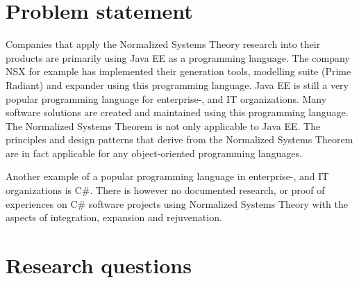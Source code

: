 \section{Problem statement} \label{problem_statement}
Companies that apply the Normalized Systems Theory research into their products are
primarily using Java EE as a programming language. The company NSX for example has
implemented their generation tools, modelling suite (Prime Radiant) and expander using
this programming language. Java EE is still a very popular programming language for
enterprise-, and IT organizations. Many software solutions are created and maintained
using this programming language. The Normalized Systems Theorem is not only applicable to
Java EE. The principles and design patterns that derive from the Normalized Systems
Theorem are in fact applicable for any object-oriented programming languages. 

Another example of a popular programming language in enterprise-, and IT organizations is
C\#. There is however no documented research, or proof of experiences on C\# software
projects using Normalized Systems Theory with the aspects of integration, expansion and
rejuvenation.





\section{Research questions} \label{ResearchQuestions}